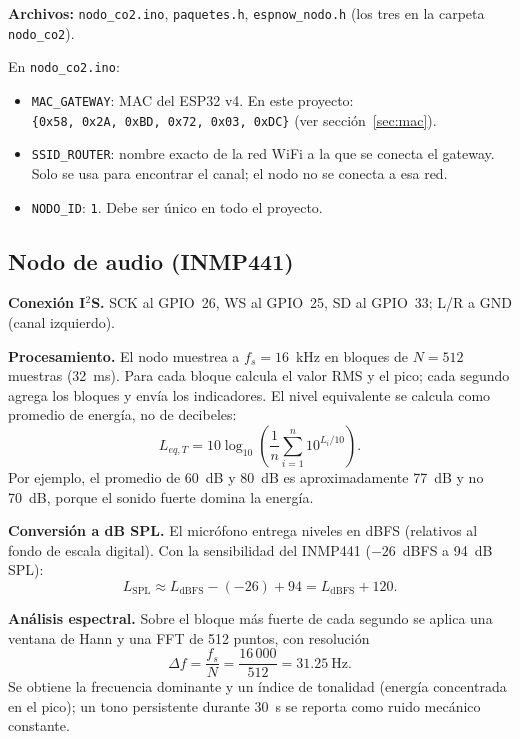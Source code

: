 \documentclass[11pt,a4paper]{article}
\newcommand{\arch}[1]{\texttt{#1}}
\begin{document}
\textbf{Archivos:} \arch{nodo\_co2.ino}, \arch{paquetes.h}, \arch{espnow\_nodo.h}
(los tres en la carpeta \arch{nodo\_co2}).

\begin{completar}
En \arch{nodo\_co2.ino}:
\begin{itemize}
  \item \texttt{MAC\_GATEWAY}: MAC del ESP32 v4. En este proyecto:\\
        \texttt{\{0x58, 0x2A, 0xBD, 0x72, 0x03, 0xDC\}} (ver secci\'on~\ref{sec:mac}).
  \item \texttt{SSID\_ROUTER}: nombre exacto de la red WiFi a la que se conecta el gateway.
        Solo se usa para encontrar el canal; el nodo no se conecta a esa red.
  \item \texttt{NODO\_ID}: \texttt{1}. Debe ser \'unico en todo el proyecto.
\end{itemize}
\end{completar}

\subsection{Nodo de audio (INMP441)}

\textbf{Conexi\'on I$^2$S.} SCK al GPIO~26, WS al GPIO~25, SD al GPIO~33; L/R a GND (canal
izquierdo).

\textbf{Procesamiento.} El nodo muestrea a $f_s = 16$~kHz en bloques de $N = 512$ muestras
(32~ms). Para cada bloque calcula el valor RMS y el pico; cada segundo agrega los bloques y
env\'ia los indicadores. El nivel equivalente se calcula como promedio de energ\'ia, no
de decibeles:
\begin{equation}
  L_{eq,T} = 10\log_{10}\!\left(\frac{1}{n}\sum_{i=1}^{n} 10^{L_i/10}\right).
\end{equation}
Por ejemplo, el promedio de 60~dB y 80~dB es aproximadamente 77~dB y no 70~dB, porque el
sonido fuerte domina la energ\'ia.

\textbf{Conversi\'on a dB SPL.} El micr\'ofono entrega niveles en dBFS (relativos al fondo de
escala digital). Con la sensibilidad del INMP441 ($-26$~dBFS a 94~dB SPL):
\begin{equation}
  L_{\text{SPL}} \approx L_{\text{dBFS}} - (-26) + 94 = L_{\text{dBFS}} + 120.
\end{equation}

\textbf{An\'alisis espectral.} Sobre el bloque m\'as fuerte de cada segundo se aplica una
ventana de Hann y una FFT de 512 puntos, con resoluci\'on
\begin{equation}
  \Delta f = \frac{f_s}{N} = \frac{16\,000}{512} = 31.25~\text{Hz}.
\end{equation}
Se obtiene la frecuencia dominante y un \'indice de tonalidad (energ\'ia concentrada en el
pico); un tono persistente durante 30~s se reporta como ruido mec\'anico constante.
\end{document}
